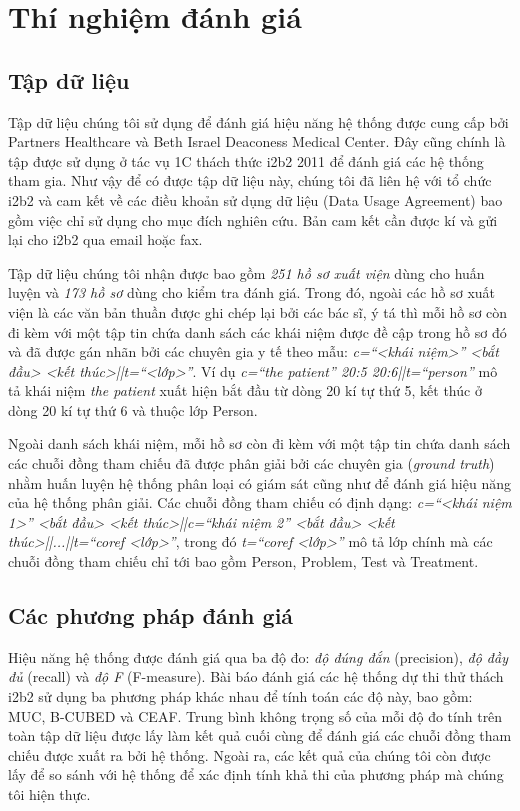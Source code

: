 \chapter{Thí nghiệm đánh giá}
\section{Tập dữ liệu}
Tập dữ liệu chúng tôi sử dụng để đánh giá hiệu năng hệ thống được cung cấp bởi Partners Healthcare và Beth Israel Deaconess Medical Center. Đây cũng chính là tập được sử dụng ở tác vụ 1C thách thức i2b2 2011 để đánh giá các hệ thống tham gia. Như vậy để có được tập dữ liệu này, chúng tôi đã liên hệ với tổ chức i2b2 và cam kết về các điều khoản sử dụng dữ liệu (Data Usage Agreement) bao gồm việc chỉ sử dụng cho mục đích nghiên cứu. Bản cam kết cần được kí và gửi lại cho i2b2 qua email hoặc fax.

Tập dữ liệu chúng tôi nhận được bao gồm \emph{251 hồ sơ xuất viện} dùng cho huấn luyện và \emph{173 hồ sơ} dùng cho kiểm tra đánh giá. Trong đó, ngoài các hồ sơ xuất viện là các văn bản thuần được ghi chép lại bởi các bác sĩ, ý tá thì mỗi hồ sơ còn đi kèm với một tập tin chứa danh sách các khái niệm được đề cập trong hồ sơ đó và đã được gán nhãn bởi các chuyên gia y tế theo mẫu: \emph{c=``<khái niệm>'' <bắt đầu> <kết thúc>||t=``<lớp>''}. Ví dụ \emph{c=``the patient'' 20:5 20:6||t=``person''} mô tả khái niệm \emph{the patient} xuất hiện bắt đầu từ dòng 20 kí tự thứ 5, kết thúc ở dòng 20 kí tự thứ 6 và thuộc lớp Person.

Ngoài danh sách khái niệm, mỗi hồ sơ còn đi kèm với một tập tin chứa danh sách các chuỗi đồng tham chiếu đã được phân giải bởi các chuyên gia (\emph{ground truth}) nhằm huấn luyện hệ thống phân loại có giám sát cũng như để đánh giá hiệu năng của hệ thống phân giải. Các chuỗi đồng tham chiếu có định dạng: \emph{c=``<khái niệm 1>'' <bắt đầu> <kết thúc>||c=``khái niệm 2'' <bắt đầu> <kết thúc>||...||t=``coref <lớp>''}, trong đó \emph{t=``coref <lớp>''} mô tả lớp chính mà các chuỗi đồng tham chiếu chỉ tới bao gồm Person, Problem, Test và Treatment.

\section{Các phương pháp đánh giá}
Hiệu năng hệ thống được đánh giá qua ba độ đo: \emph{độ đúng đắn} (precision), \emph{độ đầy đủ} (recall) và \emph{độ F} (F-measure). Bài báo đánh giá các hệ thống dự thi thử thách i2b2 sử dụng ba phương pháp khác nhau để tính toán các độ này, bao gồm: MUC, B-CUBED và CEAF. Trung bình không trọng số của mỗi độ đo tính trên toàn tập dữ liệu được lấy làm kết quả cuối cùng để đánh giá các chuỗi đồng tham chiếu được xuất ra bởi hệ thống. Ngoài ra, các kết quả của chúng tôi còn được lấy để so sánh với hệ thống \cite{YanXu2012} để xác định tính khả thi của phương pháp mà chúng tôi hiện thực.

